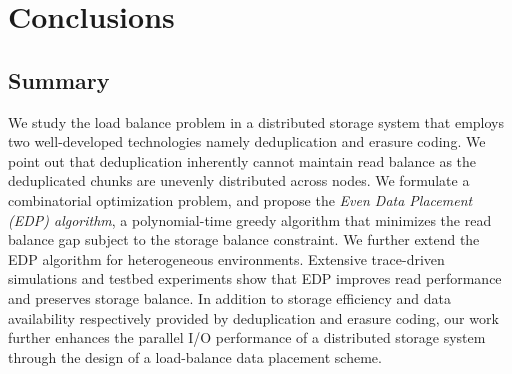 \chapter{Conclusions}
\section{Summary}
\label{sec:conclusion}

We study the load balance problem in a distributed storage system that employs
two well-developed technologies namely deduplication and erasure coding.  We
point out that deduplication inherently cannot maintain read balance as the
deduplicated chunks are unevenly distributed across nodes.  We formulate a
combinatorial optimization problem, and propose the 
{\em Even Data Placement (EDP) algorithm}, a polynomial-time greedy algorithm
that minimizes the read balance gap subject to the storage balance constraint.
We further extend the EDP algorithm for heterogeneous environments.  Extensive
trace-driven simulations and testbed experiments show that EDP improves read
performance and preserves storage balance.  In addition to storage efficiency
and data availability respectively provided by deduplication and erasure
coding, our work further enhances the parallel I/O performance of a
distributed storage system through the design of a load-balance data placement
scheme. 
